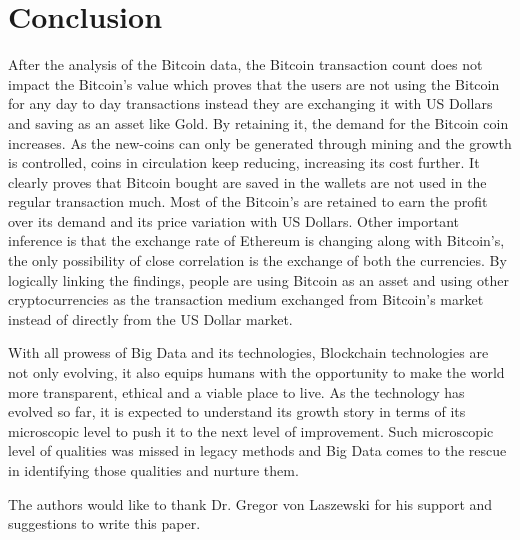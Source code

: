 \documentclass[sigconf]{acmart}
\begin{document}
\section{Conclusion}
After the analysis of the Bitcoin data, the Bitcoin transaction count does not impact the Bitcoin's value which proves that the users are not using the Bitcoin for any day to day transactions instead they are exchanging it with US Dollars and saving as an asset like Gold. By retaining it, the demand for the Bitcoin coin increases. As the new-coins can only be generated through mining and the growth is controlled, coins in circulation keep reducing, increasing its cost further. It clearly proves that Bitcoin bought are saved in the wallets are not used in the regular transaction much. Most of the Bitcoin's are retained to earn the profit over its demand and its price variation with US Dollars. Other important inference is that the exchange rate of Ethereum is changing along with Bitcoin's, the only possibility of close correlation is the exchange of both the currencies. By logically linking the findings, people are using Bitcoin as an asset and using other cryptocurrencies as the transaction medium exchanged from Bitcoin's market instead of directly from the US Dollar market.

With all prowess of Big Data and its technologies, Blockchain technologies are not only evolving, it also equips humans with the opportunity to make the world more transparent, ethical and a viable place to live. As the technology has evolved so far, it is expected to understand its growth story in terms of its microscopic level to push it to the next level of improvement. Such microscopic level of qualities was missed in legacy methods and Big Data comes to the rescue in identifying those qualities and nurture them.


\begin{acks}
  The authors would like to thank Dr. Gregor von Laszewski for his support and suggestions to write this paper.
\end{acks}


 
\end{document}
